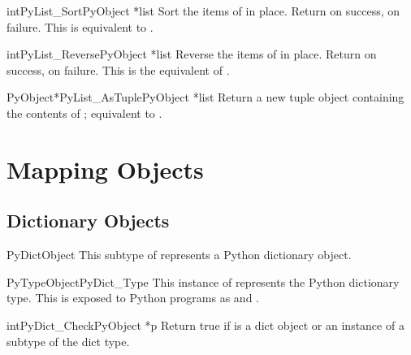 \begin{cfuncdesc}{int}{PyList_Sort}{PyObject *list}
  Sort the items of  in place.  Return  on
  success,  on failure.  This is equivalent to
  .
\end{cfuncdesc}

\begin{cfuncdesc}{int}{PyList_Reverse}{PyObject *list}
  Reverse the items of  in place.  Return  on
  success,  on failure.  This is the equivalent of
  .
\end{cfuncdesc}

\begin{cfuncdesc}{PyObject*}{PyList_AsTuple}{PyObject *list}
  Return a new tuple object containing the contents of ;
  equivalent to .
\end{cfuncdesc}


\section{Mapping Objects \label{mapObjects}}



\subsection{Dictionary Objects \label{dictObjects}}

\begin{ctypedesc}{PyDictObject}
  This subtype of  represents a Python dictionary
  object.
\end{ctypedesc}

\begin{cvardesc}{PyTypeObject}{PyDict_Type}
  This instance of  represents the Python
  dictionary type.  This is exposed to Python programs as
   and .
\end{cvardesc}

\begin{cfuncdesc}{int}{PyDict_Check}{PyObject *p}
  Return true if  is a dict object or an instance of a
  subtype of the dict type.
\end{cfuncdesc}

